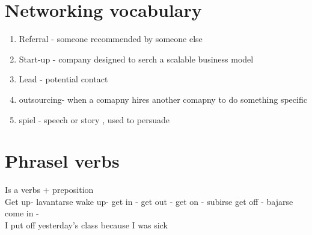 \documentclass{article}
\begin{document}
    
    \section{Networking vocabulary}
    \begin{enumerate}
        \item Referral - someone recommended by someone else
        \item Start-up - company designed to serch a scalable business model
        \item Lead - potential contact 
        \item outsourcing- when a comapny hires another comapny to do something specific
        \item spiel - speech or story , used to persuade 
    \end{enumerate}
    \section{Phrasel verbs}
    Is a verbs + preposition 
    \\ 
    Get up- lavantarse 
    wake up- 
    get in - 
    get out - 
    get on - subirse
    get off - bajarse 
    come in - 
    \\ 
    I put off yesterday's class because I was sick 
\end{document}

